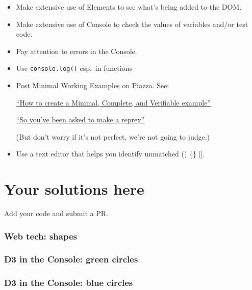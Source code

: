 \documentclass[openany]{book}
\begin{document}
\begin{itemize}
\item
  Make extensive use of Elements to see what's being added to the DOM.
\item
  Make extensive use of Console to check the values of variables and/or test code.
\item
  Pay attention to errors in the Console.
\item
  Use \texttt{console.log()} esp.~in functions
\item
  Post Minimal Working Examples on Piazza. See:

  \href{https://stackoverflow.com/help/mcve}{``How to create a Minimal, Complete, and Verifiable example''}

  \href{https://www.jessemaegan.com/post/so-you-ve-been-asked-to-make-a-reprex/}{``So you've been asked to make a reprex''}

  (But don't worry if it's not perfect, we're not going to judge.)
\item
  Use a text editor that helps you identify unmatched () \{\} {[}{]}.
\end{itemize}

\hypertarget{your-solutions-here}{%
\chapter{Your solutions here }\label{your-solutions-here}}

Add your code and submit a PR.

\hypertarget{web-tech-shapes}{%
\subsection*{Web tech: shapes}\label{web-tech-shapes}}

\hypertarget{d3-in-the-console-green-circles}{%
\subsection*{D3 in the Console: green circles}\label{d3-in-the-console-green-circles}}

\hypertarget{d3-in-the-console-blue-circles}{%
\subsection*{D3 in the Console: blue circles}\label{d3-in-the-console-blue-circles}}
\end{document}
